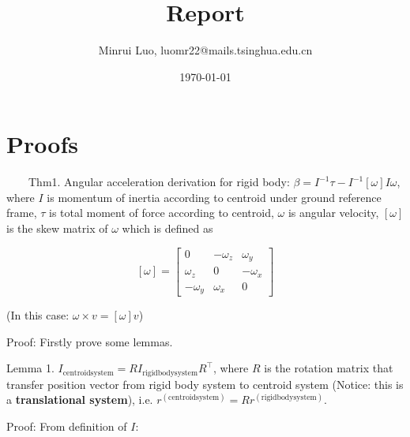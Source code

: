 \documentclass[utf8]{article}
\title{\bf\huge Report}
\author{Minrui Luo, luomr22@mails.tsinghua.edu.cn}
\date{\today}
\begin{document}
\maketitle

\section*{Proofs}

\ \ \ \ Thm1. Angular acceleration derivation for rigid body: $\beta = I^{-1} \tau - I^{-1} [\omega] I \omega$, where $I$ is momentum of inertia according to centroid under ground reference frame, $\tau$ is total moment of force according to centroid, $\omega$ is angular velocity, $[\omega]$ is the skew matrix of $\omega$ which is defined as

\begin{equation}\label{}
  [\omega] = \begin{bmatrix}
               0 & -\omega_z & \omega_y \\
               \omega_z & 0 & -\omega_x \\
               -\omega_y & \omega_x & 0
             \end{bmatrix}
\end{equation}

(In this case: $\omega \times v = [\omega] v$)

Proof: Firstly prove some lemmas.

Lemma 1. $I_{\mathrm{centroid system}} = RI_{\mathrm{rigid body system}}R^\top$, where $R$ is the rotation matrix that transfer position vector from rigid body system to centroid system (Notice: this is a \textbf{translational system}), i.e. $r^{(\mathrm{centroid system})} = R r^{(\mathrm{rigid body system})}$.

Proof: From definition of $I$:
\end{document}
